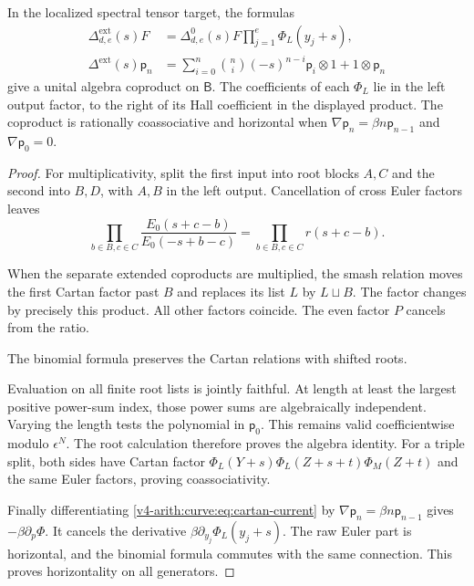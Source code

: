 \begin{proposition}\label{v4-arith:curve:prop:cartan-coproduct}
In the localized spectral tensor target, the formulas
\[
 \begin{aligned}
 \Delta^{\mathrm{ext}}_{d,e}(s)F
   &=\Delta^0_{d,e}(s)F\prod_{j=1}^e\Phi_L(y_j+s),\\
 \Delta^{\mathrm{ext}}(s)\mathsf p_n
   &=\sum_{i=0}^n\binom ni(-s)^{n-i}\mathsf p_i\otimes1
                                      +1\otimes\mathsf p_n
 \end{aligned}
\]
give a unital algebra coproduct on $\mathsf B$.
The coefficients of each $\Phi_L$ lie in the left output
factor, to the right of its Hall coefficient in the
displayed product. The coproduct is rationally coassociative
and horizontal when
$\nabla\mathsf p_n=\beta n\mathsf p_{n-1}$ and
$\nabla\mathsf p_0=0$.
\end{proposition}
\begin{proof}
For multiplicativity, split the first input into root
blocks $A,C$ and the second into $B,D$, with $A,B$ in
the left output. Cancellation of cross Euler factors leaves
\[
 \prod_{b\in B,c\in C}
      \frac{E_0(s+c-b)}{E_0(-s+b-c)}
 =\prod_{b\in B,c\in C}r(s+c-b).
\]

When the separate extended coproducts are multiplied,
the smash relation moves the first Cartan factor past
$B$ and replaces its list $L$ by $L\sqcup B$.
The factor changes by precisely this product. All other
factors coincide. The even factor $P$ cancels from the
ratio.

The binomial formula preserves the Cartan relations
with shifted roots.

Evaluation on all finite root lists is jointly faithful.
At length at least the largest positive power-sum index,
those power sums are algebraically independent.
Varying the length tests the polynomial in $\mathsf p_0$.
This remains valid coefficientwise modulo $\epsilon^N$.
The root calculation therefore proves the algebra identity.
For a triple split, both sides have Cartan factor
$\Phi_L(Y+s)\Phi_L(Z+s+t)\Phi_M(Z+t)$ and the same
Euler factors, proving coassociativity.

Finally differentiating \eqref{v4-arith:curve:eq:cartan-current}
by $\nabla\mathsf p_n=\beta n\mathsf p_{n-1}$ gives
$-\beta\partial_p\Phi$. It cancels the derivative
$\beta\partial_{y_j}\Phi_L(y_j+s)$.
The raw Euler part is horizontal, and the binomial formula
commutes with the same connection. This proves horizontality
on all generators.
\end{proof}

